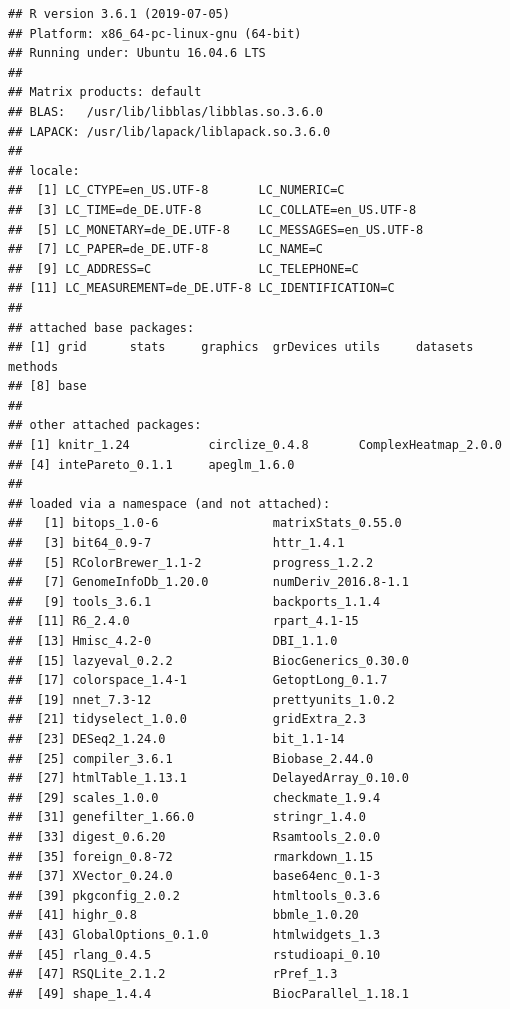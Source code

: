 \documentclass[10pt,]{article}
\begin{document}
\begin{verbatim}
## R version 3.6.1 (2019-07-05)
## Platform: x86_64-pc-linux-gnu (64-bit)
## Running under: Ubuntu 16.04.6 LTS
## 
## Matrix products: default
## BLAS:   /usr/lib/libblas/libblas.so.3.6.0
## LAPACK: /usr/lib/lapack/liblapack.so.3.6.0
## 
## locale:
##  [1] LC_CTYPE=en_US.UTF-8       LC_NUMERIC=C              
##  [3] LC_TIME=de_DE.UTF-8        LC_COLLATE=en_US.UTF-8    
##  [5] LC_MONETARY=de_DE.UTF-8    LC_MESSAGES=en_US.UTF-8   
##  [7] LC_PAPER=de_DE.UTF-8       LC_NAME=C                 
##  [9] LC_ADDRESS=C               LC_TELEPHONE=C            
## [11] LC_MEASUREMENT=de_DE.UTF-8 LC_IDENTIFICATION=C       
## 
## attached base packages:
## [1] grid      stats     graphics  grDevices utils     datasets  methods  
## [8] base     
## 
## other attached packages:
## [1] knitr_1.24           circlize_0.4.8       ComplexHeatmap_2.0.0
## [4] intePareto_0.1.1     apeglm_1.6.0        
## 
## loaded via a namespace (and not attached):
##   [1] bitops_1.0-6                matrixStats_0.55.0         
##   [3] bit64_0.9-7                 httr_1.4.1                 
##   [5] RColorBrewer_1.1-2          progress_1.2.2             
##   [7] GenomeInfoDb_1.20.0         numDeriv_2016.8-1.1        
##   [9] tools_3.6.1                 backports_1.1.4            
##  [11] R6_2.4.0                    rpart_4.1-15               
##  [13] Hmisc_4.2-0                 DBI_1.1.0                  
##  [15] lazyeval_0.2.2              BiocGenerics_0.30.0        
##  [17] colorspace_1.4-1            GetoptLong_0.1.7           
##  [19] nnet_7.3-12                 prettyunits_1.0.2          
##  [21] tidyselect_1.0.0            gridExtra_2.3              
##  [23] DESeq2_1.24.0               bit_1.1-14                 
##  [25] compiler_3.6.1              Biobase_2.44.0             
##  [27] htmlTable_1.13.1            DelayedArray_0.10.0        
##  [29] scales_1.0.0                checkmate_1.9.4            
##  [31] genefilter_1.66.0           stringr_1.4.0              
##  [33] digest_0.6.20               Rsamtools_2.0.0            
##  [35] foreign_0.8-72              rmarkdown_1.15             
##  [37] XVector_0.24.0              base64enc_0.1-3            
##  [39] pkgconfig_2.0.2             htmltools_0.3.6            
##  [41] highr_0.8                   bbmle_1.0.20               
##  [43] GlobalOptions_0.1.0         htmlwidgets_1.3            
##  [45] rlang_0.4.5                 rstudioapi_0.10            
##  [47] RSQLite_2.1.2               rPref_1.3                  
##  [49] shape_1.4.4                 BiocParallel_1.18.1        

\end{verbatim}
\end{document}
